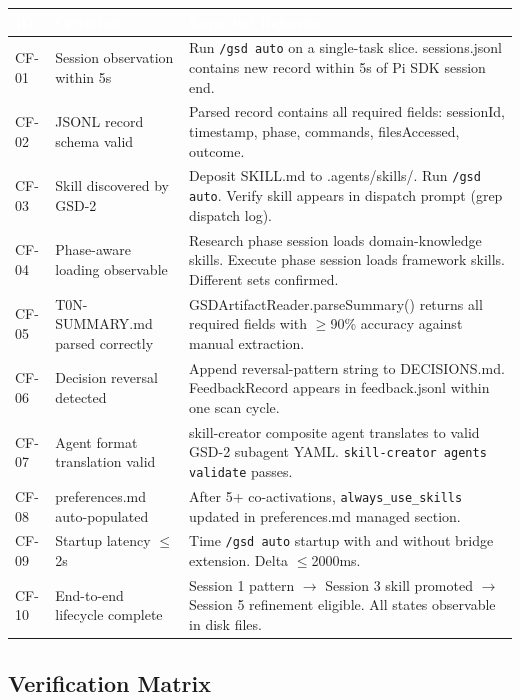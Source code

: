 \documentclass[11pt,letterpaper]{article}
\newcommand{\tableheader}[1]{\textbf{\sffamily\textcolor{white}{#1}}}
\begin{document}
\begin{center}
\begin{tabularx}{\textwidth}{L{1.5cm}L{4.5cm}X}
\toprule
{}
\tableheader{ID} & \tableheader{Criterion} & \tableheader{Expected Behavior} \\
\midrule
CF-01 & Session observation within 5s & Run \texttt{/gsd auto} on a single-task slice. sessions.jsonl contains new record within 5s of Pi SDK session end. \\
CF-02 & JSONL record schema valid & Parsed record contains all required fields: sessionId, timestamp, phase, commands, filesAccessed, outcome. \\
CF-03 & Skill discovered by GSD-2 & Deposit SKILL.md to .agents/skills/. Run \texttt{/gsd auto}. Verify skill appears in dispatch prompt (grep dispatch log). \\
CF-04 & Phase-aware loading observable & Research phase session loads domain-knowledge skills. Execute phase session loads framework skills. Different sets confirmed. \\
CF-05 & T0N-SUMMARY.md parsed correctly & GSDArtifactReader.parseSummary() returns all required fields with $\geq$90\% accuracy against manual extraction. \\
CF-06 & Decision reversal detected & Append reversal-pattern string to DECISIONS.md. FeedbackRecord appears in feedback.jsonl within one scan cycle. \\
CF-07 & Agent format translation valid & skill-creator composite agent translates to valid GSD-2 subagent YAML. \texttt{skill-creator agents validate} passes. \\
CF-08 & preferences.md auto-populated & After 5+ co-activations, \texttt{always\_use\_skills} updated in preferences.md managed section. \\
CF-09 & Startup latency $\leq$2s & Time \texttt{/gsd auto} startup with and without bridge extension. Delta $\leq$2000ms. \\
CF-10 & End-to-end lifecycle complete & Session 1 pattern $\to$ Session 3 skill promoted $\to$ Session 5 refinement eligible. All states observable in disk files. \\
\bottomrule
\end{tabularx}
\end{center}

\subsection{Verification Matrix}
\end{document}
